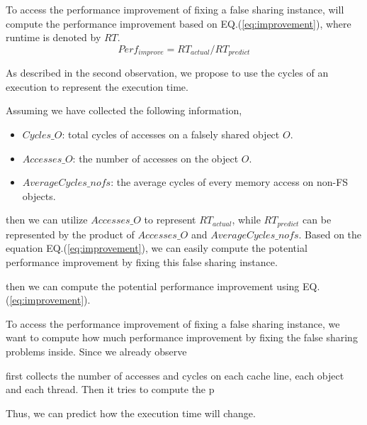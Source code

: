 To access the performance improvement of fixing a false sharing instance, \cheetah{} will compute the performance improvement based on EQ.(\ref{eq:improvement}), where runtime is denoted by $RT$.
\begin{equation}
\label{eq:improvement}
Perf_{improve}=RT_{actual}/RT_{predict}
\end{equation}

As described in the second observation, we propose to use the cycles of an execution to represent the execution time.  


Assuming we have collected the following information, 
\begin{itemize}
\item $Cycles\_O$: total cycles of accesses on a falsely shared object $O$.
\item $Accesses\_O$: the number of accesses on the object $O$.  
\item $AverageCycles\_{nofs}$: the average cycles of every memory access on non-FS objects. 
\end{itemize}

then we can utilize $Accesses\_O$ to represent $RT_{actual}$, while  $RT_{predict}$ can be represented by the product of $Accesses\_O$ and $AverageCycles\_{nofs}$. Based on the equation EQ.(\ref{eq:improvement}), we can easily compute the potential performance improvement by fixing this false sharing instance. 




then we can compute the potential performance improvement using EQ.(\ref{eq:improvement}). 





To access the performance improvement of fixing a false sharing instance, we want to compute how much performance improvement by fixing the false sharing problems inside. Since we already observe 

\cheetah{} first collects the number of accesses and cycles on each cache line, each object and each thread. Then it tries to compute the p

 Thus, we can predict how the execution time will change. 

